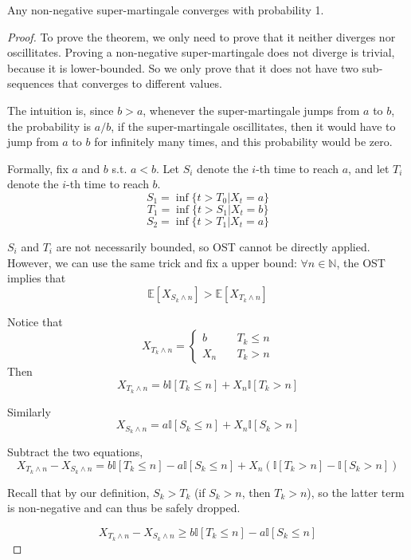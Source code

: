     \begin{theorem}\label{thm:ConvergenceOfSuperMartingale}
        Any non-negative super-martingale converges with probability 1.
    \end{theorem}
    \begin{proof}
        To prove the theorem, we only need to prove that it neither diverges nor oscillitates. Proving a non-negative super-martingale does not diverge is trivial, because it is lower-bounded. So we only prove that it does not have two sub-sequences that converges to different values.

        The intuition is, since $b > a$, whenever the super-martingale jumps from $a$ to $b$, the probability is $a/b$, if the super-martingale oscillitates, then it would have to jump from $a$ to $b$ for infinitely many times, and this probability would be zero.

        Formally, fix $a$ and $b$ s.t. $a < b$. Let $S_i$ denote the $i$-th time to reach $a$, and let $T_i$ denote the $i$-th time to reach $b$.
        \[ S_1 = \inf\{ t > T_0 | X_t = a \} \]
        \[ T_1 = \inf\{ t > S_1 | X_t = b \} \]
        \[ S_2 = \inf\{ t > T_1 | X_t = a \} \]
        
        $S_i$ and $T_i$ are not necessarily bounded, so OST cannot be directly applied. However, we can use the same trick and fix a upper bound: $\forall n \in \mathbb{N}$, the OST implies that
        \[ \mathbb{E}[X_{S_k \wedge n}] > \mathbb{E}[X_{T_k \wedge n}] \]

        Notice that
        \[ X_{T_k \wedge n} = \begin{cases}
            b &\quad T_k \le n\\
            X_n &\quad T_k > n
        \end{cases} \]
        Then
        \[ X_{T_k \wedge n} = b\mathbb{I}[T_k \le n] + X_n\mathbb{I}[T_k > n] \]

        Similarly
        \[ X_{S_k \wedge n} = a\mathbb{I}[S_k \le n] + X_n \mathbb{I}[S_k > n] \]

        Subtract the two equations,
        \[ X_{T_k \wedge n} - X_{S_k \wedge n} = b\mathbb{I}[T_k \le n] - a\mathbb{I}[S_k \le n] + X_n \left( \mathbb{I}[T_k > n] - \mathbb{I}[S_k > n] \right) \]

        Recall that by our definition, $S_k > T_k$ (if $S_k > n$, then $T_k >n$), so the latter term is non-negative and can thus be safely dropped.

        \[ X_{T_k \wedge n} - X_{S_k \wedge n} \ge b\mathbb{I}[T_k \le n] - a\mathbb{I}[S_k \le n]  \]


\end{proof}

